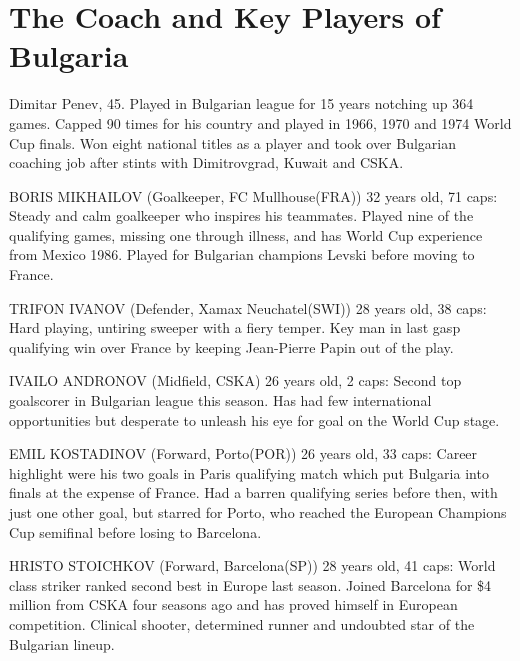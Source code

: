 \section{The Coach and Key Players of Bulgaria}
Dimitar Penev, 45. Played in Bulgarian league for 15 years notching up 364
games. Capped 90 times for his country and played in 1966, 1970 and 1974 World
Cup finals. Won eight national titles as a player and took over Bulgarian
coaching job after stints with Dimitrovgrad, Kuwait and CSKA.

BORIS MIKHAILOV (Goalkeeper, FC Mullhouse(FRA)) 32 years old, 71 caps:
Steady and calm goalkeeper who inspires his teammates. Played nine of the 
qualifying games, missing one through illness, and has World Cup experience 
from Mexico 1986. Played for Bulgarian champions Levski before moving to France.

TRIFON IVANOV (Defender, Xamax Neuchatel(SWI)) 28 years old, 38 caps:
Hard playing, untiring sweeper with a fiery temper. Key man in last gasp 
qualifying win over France by keeping Jean-Pierre Papin out of the play.

IVAILO ANDRONOV (Midfield, CSKA) 26 years old, 2 caps: 
Second top goalscorer in Bulgarian league this season. Has had few 
international opportunities but desperate to unleash his eye for goal on the 
World Cup stage.

EMIL KOSTADINOV (Forward, Porto(POR)) 26 years old, 33 caps:
Career highlight were his two goals in Paris qualifying match which put 
Bulgaria into finals at the expense of France. Had a barren qualifying series 
before then, with just one other goal, but starred for Porto, who reached the 
European Champions Cup semifinal before losing to Barcelona.

HRISTO STOICHKOV (Forward, Barcelona(SP)) 28 years old, 41 caps:
World class striker ranked second best in Europe last season. Joined Barcelona 
for \$4 million from CSKA four seasons ago and has proved himself in European
competition. Clinical shooter, determined runner and undoubted star of the
Bulgarian lineup.
